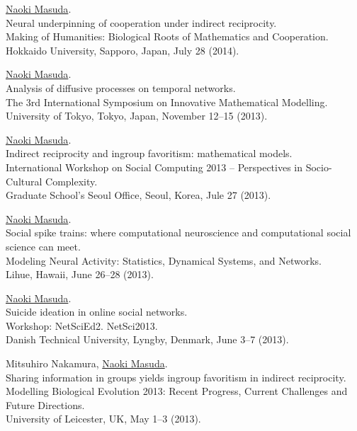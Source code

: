 \documentclass[11pt,letter]{article}
\begin{document}
\begin{etaremune}
\item \underline{Naoki Masuda}.\\
Neural underpinning of cooperation under indirect reciprocity.\\
Making of Humanities: Biological Roots of Mathematics and Cooperation.\\
Hokkaido University, Sapporo, Japan, July 28 (2014).

\item \underline{Naoki Masuda}.\\
Analysis of diffusive processes on temporal networks.\\
The 3rd International Symposium on Innovative Mathematical Modelling.\\
University of Tokyo, Tokyo, Japan, November 12--15 (2013).

\item \underline{Naoki Masuda}.\\
Indirect reciprocity and ingroup favoritism: mathematical models.\\
International Workshop on Social Computing 2013 -- Perspectives in Socio-Cultural Complexity.\\
Graduate School's Seoul Office, Seoul, Korea, Jule 27 (2013).

\item \underline{Naoki Masuda}.\\
Social spike trains: where computational neuroscience and computational social science can meet.\\
Modeling Neural Activity: Statistics, Dynamical Systems, and Networks.\\
Lihue, Hawaii, June 26--28 (2013).

\item \underline{Naoki Masuda}.\\
Suicide ideation in online social networks.\\
Workshop: NetSciEd2. NetSci2013.\\
Danish Technical University, Lyngby, Denmark, June 3--7 (2013).

\item Mitsuhiro Nakamura, \underline{Naoki Masuda}.\\
Sharing information in groups yields ingroup favoritism in indirect reciprocity.\\
Modelling Biological Evolution 2013: Recent Progress, Current Challenges and Future Directions.\\
University of Leicester, UK, May 1--3 (2013).


\end{etaremune}
\end{document}
